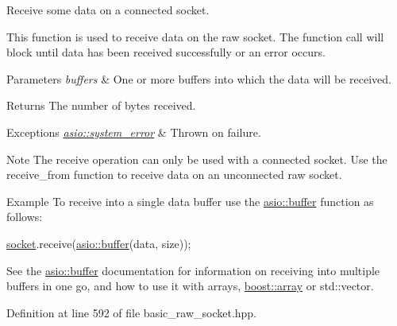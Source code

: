 Receive some data on a connected socket. 

This function is used to receive data on the raw socket. The function call will block until data has been received successfully or an error occurs.


\begin{DoxyParams}{Parameters}
{\em buffers} & One or more buffers into which the data will be received.\\
\hline
\end{DoxyParams}
\begin{DoxyReturn}{Returns}
The number of bytes received.
\end{DoxyReturn}

\begin{DoxyExceptions}{Exceptions}
{\em \hyperlink{classasio_1_1system__error}{asio\+::system\+\_\+error}} & Thrown on failure.\\
\hline
\end{DoxyExceptions}
\begin{DoxyNote}{Note}
The receive operation can only be used with a connected socket. Use the receive\+\_\+from function to receive data on an unconnected raw socket.
\end{DoxyNote}
\begin{DoxyParagraph}{Example}
To receive into a single data buffer use the \hyperlink{group__buffer}{asio\+::buffer} function as follows\+: 
\begin{DoxyCode}
\hyperlink{namespacewebsocketpp_1_1transport_1_1asio_1_1socket_1_1error_a828ddaa5ed63a761e1b557465a35f05aa0c31b356014843e1d09514e794a539a7}{socket}.receive(\hyperlink{group__buffer_ga1ed66e401559cbfd19595392f653b47c}{asio::buffer}(data, size)); 
\end{DoxyCode}
 See the \hyperlink{group__buffer}{asio\+::buffer} documentation for information on receiving into multiple buffers in one go, and how to use it with arrays, \hyperlink{classboost_1_1array}{boost\+::array} or std\+::vector. 
\end{DoxyParagraph}


Definition at line 592 of file basic\+\_\+raw\+\_\+socket.\+hpp.

\hypertarget{classasio_1_1basic__raw__socket_a1154a6df2008df5a3aea7d97113611c7}{}
